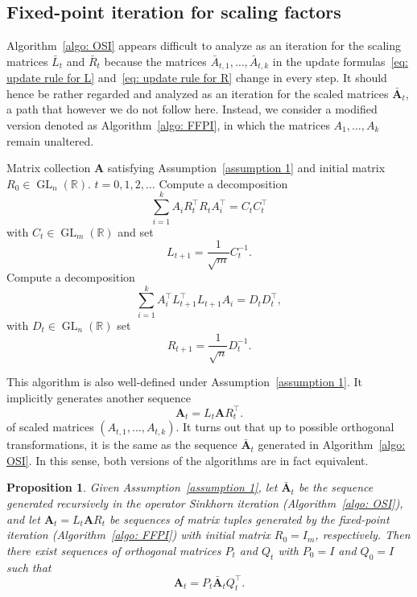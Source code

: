 \documentclass[a4paper]{article}
\newcommand{\R}{\mathbb{R}}
\newcommand{\bA}{\mathbf{A}}
\DeclareMathOperator{\GL}{GL}
\newtheorem{proposition}[theorem]{Proposition}
\theoremstyle{definition}
\numberwithin{equation}{section}
\begin{document}
\subsection{Fixed-point iteration for scaling factors}
Algorithm~\ref{algo: OSI} appears difficult to analyze as an iteration for the scaling matrices $\bar L_t$ and $\bar R_t$ because the matrices $\bar A_{t,1},\dots,\bar A_{t,k}$ in the update formulas~\eqref{eq: update rule for L} and~\eqref{eq: update rule for R} change in every step. It should hence be rather regarded and analyzed as an iteration for the scaled matrices $\bar{\bA}_t$, a path that however we do not follow here. Instead, we consider a modified version denoted as Algorithm~\ref{algo: FFPI}, in which the matrices $A_{1},\dots,A_k$ remain unaltered.

\begin{algorithm}[t]
\small
\caption{Factor Fixed-point Iteration}
\label{algo: FFPI}
\begin{algorithmic}[1]
\Input
Matrix collection $\bA$ satisfying Assumption~\ref{assumption 1} and initial matrix $R_0 \in \GL_n(\R)$.
\For
{$t = 0,1,2,\dots$}
    \State
    Compute a decomposition
    \[
    \sum_{i=1}^k A_{i}^{} R_t^\top R_t^{} A_{i}^\top = C_t^{} C_t^\top
    \]
    with $C_t \in \GL_m(\R)$ and set
    \[
    L_{t+1} = \frac{1}{\sqrt{m}} C_t^{-1}.
    \]
    \State
    Compute a decomposition
    \[
    \sum_{i=1}^k A_{i}^{\top} L_{t+1}^\top L_{t+1}^{} A_{i}^{} = D_t^{} D_t^\top,
    \]
    with $D_t \in \GL_n(\R)$ set
    \[
    R_{t+1} = \frac{1}{\sqrt{n}} D_t^{-1}.
    \]
\EndFor
\end{algorithmic}
\end{algorithm}

This algorithm is also well-defined under Assumption~\ref{assumption 1}. It implicitly generates another sequence
\[
 \bA_t^{} = L_t^{} \bA R_t^\top.
\]
of scaled matrices $(A_{t,1},\dots,A_{t,k})$. It turns out that up to possible orthogonal transformations, it is the same as the sequence $\bar{\bA}_t$ generated in Algorithm~\ref{algo: OSI}. In this sense, both versions of the algorithms are in fact equivalent.

\begin{proposition}\label{prop: equivalence of algorithms}
Given Assumption~\ref{assumption 1}, let $\bar{\bA}_t$ be the sequence generated recursively in the operator Sinkhorn iteration (Algorithm~\ref{algo: OSI}), and let $\bA_t = L_t \bA R_t$ be sequences of matrix tuples generated by the fixed-point iteration (Algorithm~\ref{algo: FFPI}) with initial matrix $R_0 = I_m$, respectively. Then there exist sequences of orthogonal matrices $P_t$ and $Q_t$ with $P_0 = I$ and $Q_0 = I$ such that
\[
 \bA_t^{} = P_t^{} \bar{\bA}_t^{} Q_t^\top.
\]
\end{proposition}
\end{document}
